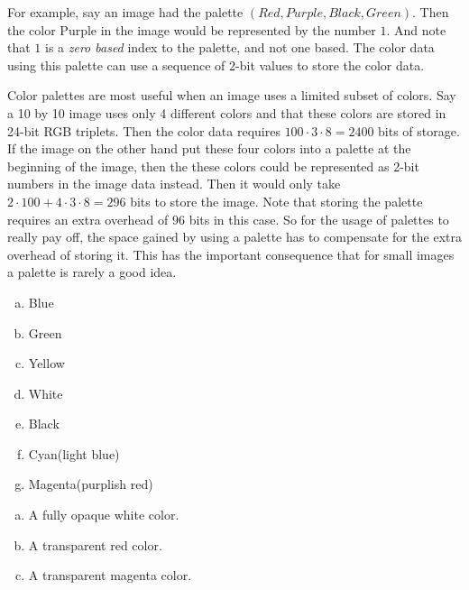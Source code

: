 For example, say an image had the palette $(Red, Purple, Black,
Green)$. Then the color Purple in the image would be represented by
the number $1$. And note that $1$ is a \textit{zero based} index to
the palette, and not one based. The color data using this palette can
use a sequence of 2-bit values to store the color data.

Color palettes are most useful when an image uses a limited subset of
colors. Say a 10 by 10 image uses only 4 different colors and that
these colors are stored in 24-bit RGB triplets. Then the color data
requires $100 \cdot 3 \cdot 8 = 2400$ bits of storage. If the image on
the other hand put these four colors into a palette at the beginning
of the image, then the these colors could be represented as 2-bit
numbers in the image data instead. Then it would only take $2 \cdot
100 + 4 \cdot 3 \cdot 8 = 296$ bits to store the image. Note that
storing the palette requires an extra overhead of $96$ bits in this
case. So for the usage of palettes to really pay off, the space gained
by using a palette has to compensate for the extra overhead of storing
it. This has the important consequence that for small images a palette
is rarely a good idea.

\answers{}

\begin{Answer}[ref={rgb-triplet}]
  \begin{enumerate}[(a)]
  \item Blue
  \item Green
  \item Yellow
  \item White
  \item Black
  \item Cyan(light blue)
  \item Magenta(purplish red)
  \end{enumerate}
\end{Answer}

\begin{Answer}[ref={tga-16-bit}]

  \begin{enumerate}[(a)]
  \item A fully opaque white color.
  \item A transparent red color.
  \item A transparent magenta color.
  \end{enumerate}

\end{Answer}
